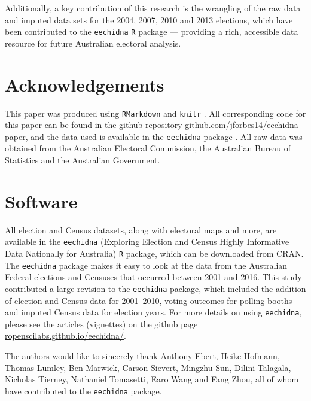 \documentclass[times, doublespace]{anzsauth}
\begin{document}
Additionally, a key contribution of this research is the wrangling of the raw data and imputed data sets for the 2004, 2007, 2010 and 2013 elections, which have been contributed to the \texttt{eechidna} \texttt{R} package --- providing a rich, accessible data resource for future Australian electoral analysis.

\hypertarget{acknowledgements}{%
\section{Acknowledgements}\label{acknowledgements}}

This paper was produced using \texttt{RMarkdown} \citep{rmarkdown} and \texttt{knitr} \citep{knitr}. All corresponding code for this paper can be found in the github repository \href{https://github.com/jforbes14/eechidna-paper}{github.com/jforbes14/eechidna-paper}, and the data used is available in the \texttt{eechidna} package \citep{eechidna}. All raw data was obtained from the Australian Electoral Commission, the Australian Bureau of Statistics and the Australian Government.

\hypertarget{software}{%
\section{Software}\label{software}}

All election and Census datasets, along with electoral maps and more, are available in the \texttt{eechidna} (Exploring Election and Census Highly Informative Data Nationally for Australia) \texttt{R} package, which can be downloaded from CRAN. The \texttt{eechidna} package makes it easy to look at the data from the Australian Federal elections and Censuses that occurred between 2001 and 2016. This study contributed a large revision to the \texttt{eechidna} package, which included the addition of election and Census data for 2001--2010, voting outcomes for polling booths and imputed Census data for election years. For more details on using \texttt{eechidna}, please see the articles (vignettes) on the github page \href{https://ropenscilabs.github.io/eechidna/}{ropenscilabs.github.io/eechidna/}.

The authors would like to sincerely thank Anthony Ebert, Heike Hofmann, Thomas Lumley, Ben Marwick, Carson Sievert, Mingzhu Sun, Dilini Talagala, Nicholas Tierney, Nathaniel Tomasetti, Earo Wang and Fang Zhou, all of whom have contributed to the \texttt{eechidna} package.

\renewcommand\refname{References}

\end{document}
